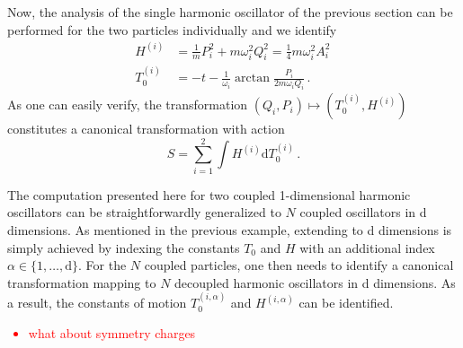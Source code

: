 \documentclass[onecolumn,notitlepage,superscriptaddress, nofootinbib,nobibnotes, aps,prd,10pt]{revtex4-1}%
\def\dd{\mathrm{d}}
\begin{document}
Now, the analysis of the single harmonic oscillator of the previous section can be performed for the two particles individually and we identify
%
\begin{subequations}
\begin{align}
H^{(i)} &= \frac{1}{m}P_i^2+m\omega_i^2Q_i^2 = \frac{1}{4}m\omega_i^2A_i^2\, \\[7pt]
T_0^{(i)} &= -t-\frac{1}{\omega_i}\arctan\frac{P_i}{2m\omega_iQ_i}\, .
\end{align}   
\end{subequations}
%
As one can easily verify, the transformation $(Q_i,P_i)\mapsto (T_0^{(i)},H^{(i)})$ constitutes a canonical transformation with action
%
\begin{equation}
S = \sum_{i=1}^2\int H^{(i)}\dd{T_0^{(i)}}\, .
\end{equation}
%

The computation presented here for two coupled 1-dimensional harmonic oscillators can be straightforwardly generalized to $N$ coupled oscillators in d dimensions. As mentioned in the previous example, extending to d dimensions is simply achieved by indexing the constants $T_0$ and $H$ with an additional index $\alpha\in\{1,\dots,\mathrm{d}\}$. For the $N$ coupled particles, one then needs to identify a canonical transformation mapping to $N$ decoupled harmonic oscillators in d dimensions. As a result, the constants of motion $T_0^{(i,\alpha)}$ and $H^{(i,\alpha)}$ can be identified.

\textcolor{red}{
\begin{itemize}
    \item what about symmetry charges
\end{itemize}
}



\allowdisplaybreaks


\let\oldaddcontentsline\addcontentsline%
\renewcommand{\addcontentsline}[3]{}%

 

% 




\let\addcontentsline\oldaddcontentsline%

%
\end{document}
